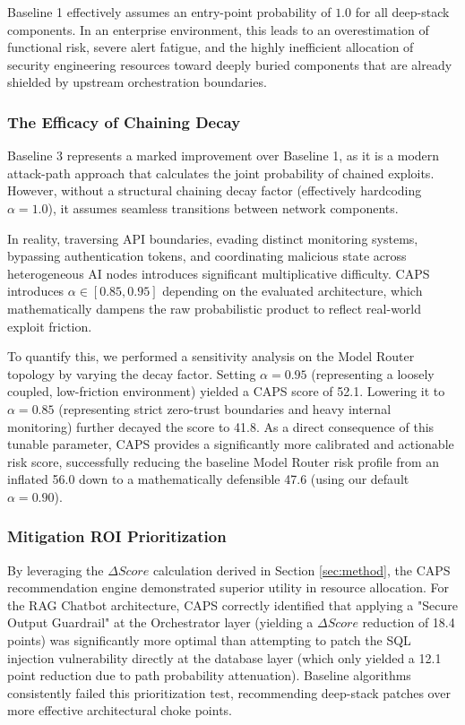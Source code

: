 Baseline 1 effectively assumes an entry-point probability of $1.0$ for all deep-stack components. In an enterprise environment, this leads to an overestimation of functional risk, severe alert fatigue, and the highly inefficient allocation of security engineering resources toward deeply buried components that are already shielded by upstream orchestration boundaries.

\subsubsection{The Efficacy of Chaining Decay} 
Baseline 3 represents a marked improvement over Baseline 1, as it is a modern attack-path approach that calculates the joint probability of chained exploits. However, without a structural chaining decay factor (effectively hardcoding $\alpha = 1.0$), it assumes seamless transitions between network components. 

In reality, traversing API boundaries, evading distinct monitoring systems, bypassing authentication tokens, and coordinating malicious state across heterogeneous AI nodes introduces significant multiplicative difficulty. CAPS introduces $\alpha \in [0.85, 0.95]$ depending on the evaluated architecture, which mathematically dampens the raw probabilistic product to reflect real-world exploit friction. 

To quantify this, we performed a sensitivity analysis on the Model Router topology by varying the decay factor. Setting $\alpha = 0.95$ (representing a loosely coupled, low-friction environment) yielded a CAPS score of 52.1. Lowering it to $\alpha = 0.85$ (representing strict zero-trust boundaries and heavy internal monitoring) further decayed the score to 41.8. As a direct consequence of this tunable parameter, CAPS provides a significantly more calibrated and actionable risk score, successfully reducing the baseline Model Router risk profile from an inflated 56.0 down to a mathematically defensible 47.6 (using our default $\alpha = 0.90$).

\subsubsection{Mitigation ROI Prioritization}
By leveraging the $\Delta Score$ calculation derived in Section \ref{sec:method}, the CAPS recommendation engine demonstrated superior utility in resource allocation. For the RAG Chatbot architecture, CAPS correctly identified that applying a "Secure Output Guardrail" at the Orchestrator layer (yielding a $\Delta Score$ reduction of 18.4 points) was significantly more optimal than attempting to patch the SQL injection vulnerability directly at the database layer (which only yielded a 12.1 point reduction due to path probability attenuation). Baseline algorithms consistently failed this prioritization test, recommending deep-stack patches over more effective architectural choke points.

